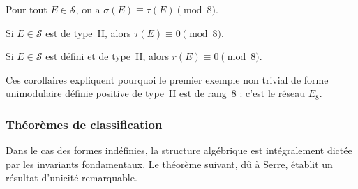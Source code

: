 \begin{theorem}
\label{thm:mod8}
Pour tout $E \in \mathcal{S}$, on a $\sigma(E) \equiv \tau(E) \pmod{8}$.
\end{theorem}

\begin{corollary}
\label{cor:typeII_mod8}
Si $E \in \mathcal{S}$ est de type~II, alors $\tau(E) \equiv 0 \pmod{8}$.
\end{corollary}

\begin{corollary}
Si $E \in \mathcal{S}$ est défini et de type~II, alors $r(E) \equiv 0 \pmod{8}$.
\end{corollary}

\begin{remark}
Ces corollaires expliquent pourquoi le premier exemple non trivial de forme unimodulaire
définie positive de type~II est de rang~$8$ : c'est le réseau $E_8$.
\end{remark}

\subsubsection{Théorèmes de classification}

Dans le cas des formes indéfinies, la structure algébrique est intégralement dictée par les invariants fondamentaux. Le théorème suivant, dû à Serre, établit un résultat d'unicité remarquable.

